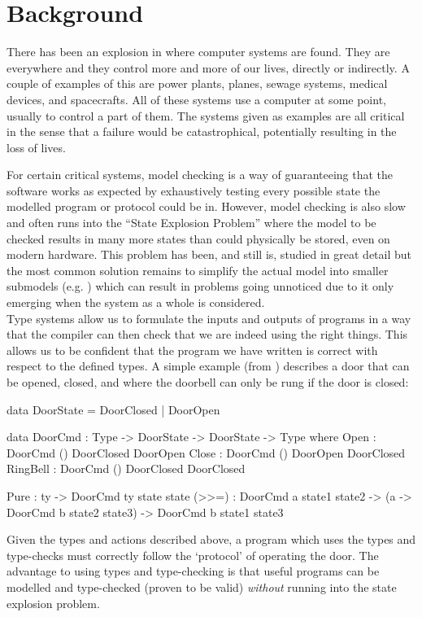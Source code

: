 \documentclass[11pt]{article}
\begin{document}
    \section*{Background}
    There has been an explosion in where computer systems are found. They are
    everywhere and they control more and more of our lives, directly or
    indirectly. A couple of examples of this are power plants, planes, sewage
    systems, medical devices, and spacecrafts. All of these systems use a
    computer at some point, usually to control a part of them. The systems
    given as examples are all critical in the sense that a failure would be
    catastrophical, potentially resulting in the loss of lives.
    
    For certain critical systems, model checking is a way of guaranteeing that
    the software works as expected by exhaustively testing every possible state
    the modelled program or protocol could be in. However, model checking is
    also slow and often runs into the ``State Explosion Problem''
    \cite{goos_state_1998} where the model to be checked results in many more
    states than could physically be stored, even on modern hardware. This
    problem has been, and still is, studied in great detail
    \cite{goos_progress_2001,stuart_simulation-verification_2001,demri_parametric_2006,clarke_model_2008,kress-gazit_correct_2011,meyer_model_2012}
    but the most common solution remains to simplify the actual model into
    smaller submodels (e.g. \cite{yan_sun_verifying_2007}) which can result in
    problems going unnoticed due to it only emerging when the system as a whole
    is considered.\\
    
    Type systems allow us to formulate the inputs and outputs of programs in a
    way that the compiler can then check that we are indeed using the right
    things. This allows us to be confident that the program we have written is
    correct with respect to the defined types. A simple example (from
    \cite{brady_type-driven_2017}) describes a door that can be opened, closed,
    and where the doorbell can only be rung if the door is closed:
    \begin{idrislisting}
data DoorState = DoorClosed | DoorOpen

data DoorCmd : Type -> DoorState -> DoorState -> Type
  where
    Open : DoorCmd     () DoorClosed DoorOpen
    Close : DoorCmd    () DoorOpen DoorClosed
    RingBell : DoorCmd () DoorClosed DoorClosed
    
    Pure : ty -> DoorCmd ty state state
    (>>=) : DoorCmd a state1 state2 ->
            (a -> DoorCmd b state2 state3) ->
            DoorCmd b state1 state3
    \end{idrislisting}
    Given the types and actions described above, a program which uses the types
    and type-checks must correctly follow the `protocol' of operating the door.
    The advantage to using types and type-checking is that useful programs can
    be modelled and type-checked (proven to be valid) \textit{without}
    running into the state explosion problem.
    
\end{document}

